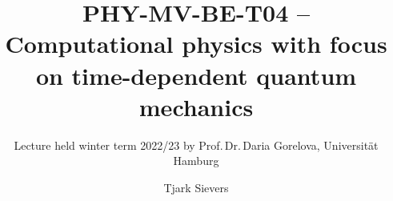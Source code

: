 \documentclass{lecture-notes}
\begin{document}
\title{PHY-MV-BE-T04 -- Computational physics with focus on time-dependent quantum mechanics}
\author{Tjark Sievers}
\subtitle{Lecture held winter term 2022/23 by Prof.\,Dr.\,Daria Gorelova, Universität Hamburg}
\date{}
\maketitle

{\hypersetup{hidelinks}\tableofcontents}


















\end{document}
